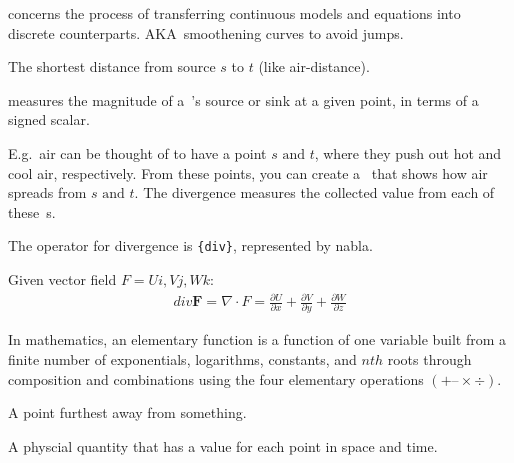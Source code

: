 \begin{definition}[Discretization]
    concerns the process of transferring
    continuous models and equations into discrete counterparts. 
    AKA\ smoothening curves to avoid jumps.

\end{definition}

\begin{definition}[Displacement]
    The shortest distance from source $s$ to $t$ (like air-distance).

\end{definition}

\begin{definition}[Divergence]\label{divergence}
    measures the magnitude of a~'s source or sink at a
    given point, in terms of a signed scalar.

    E.g.\ air can be thought of to have a point $s \text{ and } t$, where they
    push out hot and cool air, respectively. From these points, you can create
    a~ that shows how air spreads from $s \text{ and }
    t$. The divergence measures the collected value from each of 
    these~s.

    The operator for divergence is \verb|{div}|, represented by nabla.

    Given vector field $F = Ui, Vj, Wk$:
    \begin{align}
            div \textbf{F} = \nabla \cdot F = 
            \frac{\partial{U}}{\partial{x}}+
            \frac{\partial{V}}{\partial{y}} +
            \frac{\partial{W}}{\partial{z}}
    \end{align}

\end{definition}

\begin{definition}
    In mathematics, an elementary function is a function of one variable built
    from a finite number of exponentials, logarithms, constants, and $nth$ roots
    through composition and combinations using the four elementary operations
    $(+ – × ÷)$.

\end{definition}

\begin{definition}
    A point furthest away from something.
\end{definition}

\begin{definition}[Field]
    A physcial quantity that has a value for each point in space and time.
\end{definition}

